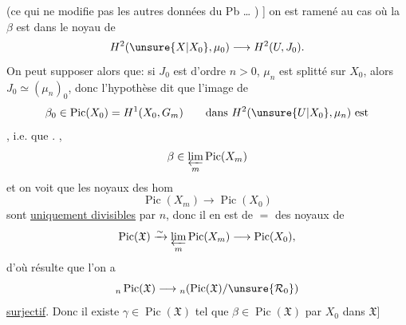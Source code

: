 (ce qui ne modifie pas les autres données du Pb \ldots
{}) ]
on est ramené au cas où la  $\beta$ est dans le noyau de
\[
 H^2(\unsure{X|X_0},\mu_0)\longrightarrow H^2(U,J_0).
\]
On peut supposer alors que: si $J_0$ est d'ordre $n>0$,
$\mu_n$ est splitté sur $X_0$, alors $J_0\simeq(\mu_n)_0$, donc
l'hypothèse dit que l'image de \deleted{$\unsure{\beta}$}
\[
 \beta_0\in\operatorname{Pic}(X_0)=H^1(X_0,G_m)
 \qquad\text{dans }H^2(\unsure{U|X_0},\mu_n)\text{ est}
\]
, i.e. que
.
 , 
\[
 \beta\in\varprojlim_m\operatorname{Pic}(X_m)
\]
et on voit que les noyaux des hom
\[
 \operatorname{Pic}(X_m)\longrightarrow\operatorname{Pic}(X_0)
\]
sont  \uline{uniquement divisibles} par $n$,
donc il en est de $=$ des noyaux de
\[
 \operatorname{Pic}(\mathfrak X)\xrightarrow{\sim}
 \varprojlim_m\operatorname{Pic}(X_m)\longrightarrow\operatorname{Pic}(X_0),
\]
d'où résulte que l'on a
\[
 {}_n\operatorname{Pic}(\mathfrak X)\longrightarrow
 {}_n(\operatorname{Pic}(\mathfrak X)/\unsure{\mathcal R_0})
\]
\uline{surjectif}. Donc il existe $\gamma\in\operatorname{Pic}(\mathfrak X)$
tel que
$\beta\in\operatorname{Pic}(\mathfrak X)$
 par $X_0$ dans $\mathfrak X$]
